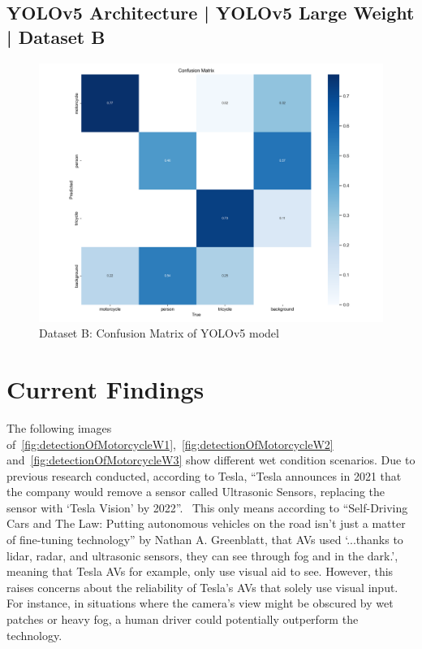 \documentclass[conference]{IEEEtran}
\begin{document}
	\subsection{YOLOv5 Architecture | YOLOv5 Large Weight | Dataset B}
		\begin{figure}[h]
			\centering
			\includegraphics[width=\columnwidth]{Figures/b_confusion_matrix.png}
			\caption{Dataset B: Confusion Matrix of YOLOv5 model}
			\label{fig:mtpDatasetYolov5LargeWeight}
		\end{figure}

\section{Current Findings}
	The following images of~\ref{fig:detectionOfMotorcycleW1},~\ref{fig:detectionOfMotorcycleW2} and~\ref{fig:detectionOfMotorcycleW3} show different wet condition scenarios. Due to previous research conducted, according to Tesla, ``Tesla announces in 2021 that the company would remove a sensor called Ultrasonic Sensors, replacing the sensor with `Tesla Vision' by 2022''.~\cite{noauthor_tesla_nodate} This only means according to ``Self-Driving Cars and The Law: Putting autonomous vehicles on the road isn't just a matter of fine-tuning technology'' by Nathan A. Greenblatt, that AVs used `...thanks to lidar, radar, and ultrasonic sensors, they can see through fog and in the dark.', meaning that Tesla AVs for example, only use visual aid to see. However, this raises concerns about the reliability of Tesla's AVs that solely use visual input. For instance, in situations where the camera's view might be obscured by wet patches or heavy fog, a human driver could potentially outperform the technology.
\end{document}

